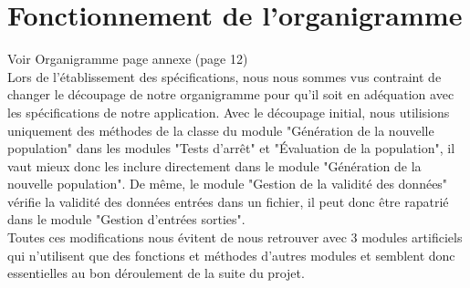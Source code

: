 \documentclass[a4paper,11pt]{article}
\begin{document}
	
	\section{Fonctionnement de l'organigramme}
		Voir Organigramme page annexe (page 12)\\

		Lors de l'établissement des spécifications, nous nous sommes vus contraint de changer le découpage de notre organigramme pour qu’il soit en adéquation avec les spécifications de notre application. 
		Avec le découpage initial, nous utilisions uniquement des méthodes de la classe du module "Génération de la nouvelle population" dans les modules "Tests d’arrêt" et "Évaluation de la population", il vaut mieux donc les inclure directement dans le module "Génération de la nouvelle population".
		De même, le module "Gestion de la validité des données" vérifie la validité des données entrées dans un fichier, il peut donc être rapatrié dans le module "Gestion d'entrées sorties". \\
		Toutes ces modifications nous évitent de nous retrouver avec 3 modules artificiels qui n'utilisent que des fonctions et méthodes d'autres modules et semblent donc essentielles au bon déroulement de la suite du projet.\\

		
		
\end{document}
